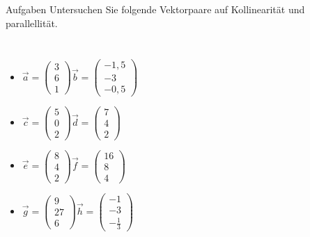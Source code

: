 \documentclass[11pt, aspectratio=169]{beamer}
\begin{document}
	\begin{frame}{Aufgaben}
		Untersuchen Sie folgende Vektorpaare auf Kollinearität und parallellität.
		\begin{columns}
			\begin{itemize}
				\item $\vec{a} = \left( \begin{array}{c} 3 \\ 6 \\ 1 \end{array} \right) \vec{b} = \left( \begin{array}{c} -1,5 \\ -3 \\ -0,5 \end{array} \right)$
				\color{green}
				\uncover<2->{\checkmark, a}
				\color{black}
				\item $\vec{c} = \left( \begin{array}{c} 5 \\ 0 \\ 2 \end{array} \right) \vec{d} = \left( \begin{array}{c} 7 \\ 4 \\ 2 \end{array} \right)$
				\item $\vec{e} = \left( \begin{array}{c} 8 \\ 4 \\ 2 \end{array} \right) \vec{f} = \left( \begin{array}{c} 16 \\ 8 \\ 4 \end{array} \right)$
				\color{green}
				\uncover<2->{\checkmark, p}
				\color{black}
				\item $\vec{g} = \left( \begin{array}{c} 9 \\ 27 \\ 6 \end{array} \right) \vec{h} = \left( \begin{array}{c} -1 \\ -3 \\ -\frac{1}{3} \end{array} \right)$
				\color{green}
				\uncover<2->{\checkmark, a}
				\color{black}
			\end{itemize}

\end{columns}
\end{frame}
\end{document}
